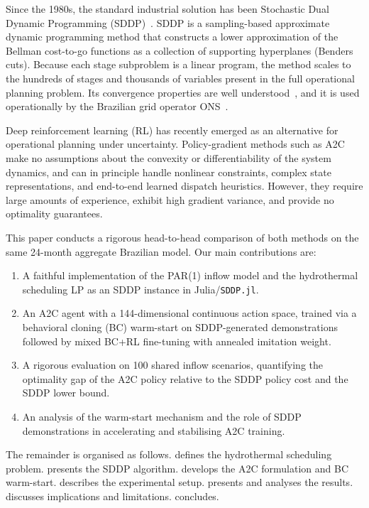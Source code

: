 \documentclass[11pt,letterpaper]{article}
\begin{document}
Since the 1980s, the standard industrial solution has been Stochastic Dual Dynamic
Programming (SDDP)~\citep{pereira1991,shapiro2013}.
SDDP is a sampling-based approximate dynamic programming method that constructs a
lower approximation of the Bellman cost-to-go functions as a collection of
supporting hyperplanes (Benders cuts).
Because each stage subproblem is a linear program, the method scales to the
hundreds of stages and thousands of variables present in the full operational
planning problem.
Its convergence properties are well understood~\citep{philpott2008}, and it is
used operationally by the Brazilian grid operator ONS~\citep{shapiro2011}.

Deep reinforcement learning (RL) has recently emerged as an alternative for
operational planning under uncertainty.
Policy-gradient methods such as A2C~\citep{mnih2016} make no assumptions about
the convexity or differentiability of the system dynamics, and can in principle
handle nonlinear constraints, complex state representations, and end-to-end
learned dispatch heuristics.
However, they require large amounts of experience, exhibit high gradient variance,
and provide no optimality guarantees.

This paper conducts a rigorous head-to-head comparison of both methods on the same
24-month aggregate Brazilian model.
Our main contributions are:
\begin{enumerate}[noitemsep]
  \item A faithful implementation of the PAR(1) inflow model and the
        hydrothermal scheduling LP as an SDDP instance in Julia/\texttt{SDDP.jl}.
  \item An A2C agent with a 144-dimensional continuous action space, trained via a
        behavioral cloning (BC) warm-start on SDDP-generated demonstrations
        followed by mixed BC+RL fine-tuning with annealed imitation weight.
  \item A rigorous evaluation on 100 shared inflow scenarios, quantifying the
        optimality gap of the A2C policy relative to the SDDP policy cost and the
        SDDP lower bound.
  \item An analysis of the warm-start mechanism and the role of SDDP demonstrations
        in accelerating and stabilising A2C training.
\end{enumerate}

The remainder is organised as follows.
 defines the hydrothermal scheduling problem.
 presents the SDDP algorithm.
 develops the A2C formulation and BC warm-start.
 describes the experimental setup.
 presents and analyses the results.
 discusses implications and limitations.
 concludes.
\end{document}
